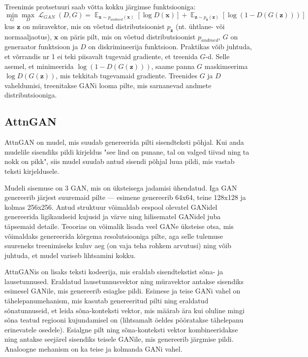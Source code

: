 \documentclass{vilgym}
\DeclareMathOperator{\EX}{\mathbb{E}}
\DeclareMathOperator{\loss}{\mathcal{L}}
\begin{document}
	Treenimis protsetuuri saab võtta kokku järgimse funktsiooniga:
	\begin{equation}
		\operatorname*{min}_G \operatorname*{max}_D \loss_{GAN}(D,G) = \EX_{\boldsymbol{x}\sim p_{andmed}(\boldsymbol{x})}[\log D(\boldsymbol{x})] + \EX_{\boldsymbol{z}\sim p_{\boldsymbol{z}}(\boldsymbol{z})}[\log(1-D(G(\boldsymbol{z})))]
	\end{equation}
	kus $ \boldsymbol{z} $ on müravektor, mis on võetud distributsioonist $ p_{\boldsymbol{z}} $ (nt. ühtlane- või normaaljaotus), $ \boldsymbol{x} $ on päris pilt, mis on võetud distributsioonist $ p_{andmed} $, $ G $ on generaator funktsioon ja $ D $ on diskrimineerija funktsioon. Praktikas võib juhtuda, et võrrandis nr 1 ei teki piisavalt tugevaid gradiente, et treenida $ G $-d. Selle asemel, et minimeerida $ \log (1 - D(G(\boldsymbol{z}))) $, saame panna $ G $ maskimeerima $ \log D(G(\boldsymbol{z})) $, mis tekkitab tugevamaid gradiente. Treenides $ G $ ja $ D $ vaheldumisi, treenitakse GANi looma pilte, mis sarnanevad andmete distributsiooniga. \parencite{gan}

	
	\subsection{AttnGAN}

	AttnGAN on mudel, mis suudab genereerida pilti sisendteksti põhjal. Kui anda mudelile sisendiks pildi kirjeldus "see lind on punane, tal on valged tiivad ning ta nokk on pikk", siis mudel suudab antud sisendi põhjal luua pildi, mis vastab teksti kirjeldusele.
	
	Mudeli sisemuse on 3 GAN, mis on üksteisega jadamisi ühendatud. Iga GAN genereerib järjest suuremaid pilte --- esimene genereerib 64x64, teine 128x128 ja kolmas 256x256. Antud struktuur võimaldab eespool olevatel GANidel genereerida ligikaudseid kujusid ja värve ning hilisematel GANidel juba täpsemaid detaile. Teoorias on võimalik lisada veel GANe üksteise otsa, mis võimaldaks genereerida kõrgema resolutsiooniga pilte, aga selle tulemuse suureneks treenimiseks kuluv aeg (on vaja teha rohkem arvutusi) ning võib juhtuda, et mudel variseb lihtsamini kokku.

	AttnGANis on lisaks teksti kodeerija, mis eraldab sisendtekstist sõna- ja lausetunnused. Eraldatud lausetunnusvektor ning müravektor antakse sisendiks esimesel GANile, mis genereerib esiaglse pildi. Esimese ja teise GANi vahel on tähelepanumehanism, mis kasutab genereeritud pilti ning eraldatud sõnatunnuseid, et leida sõna-konteksti vektor, mis määrab ära kui oluline mingi sõna teatud regiooni kujundamisel on (lihtsamalt öeldes pööratakse tähelepanu erinevatele osedele). Esialgne pilt ning sõna-konteksti vektor kombineeridakse ning antakse seejärel sisendiks teisele GANile, mis genereerib järgmise pildi. Analoogne mehanism on ka teise ja kolmanda GANi vahel.
\end{document}
